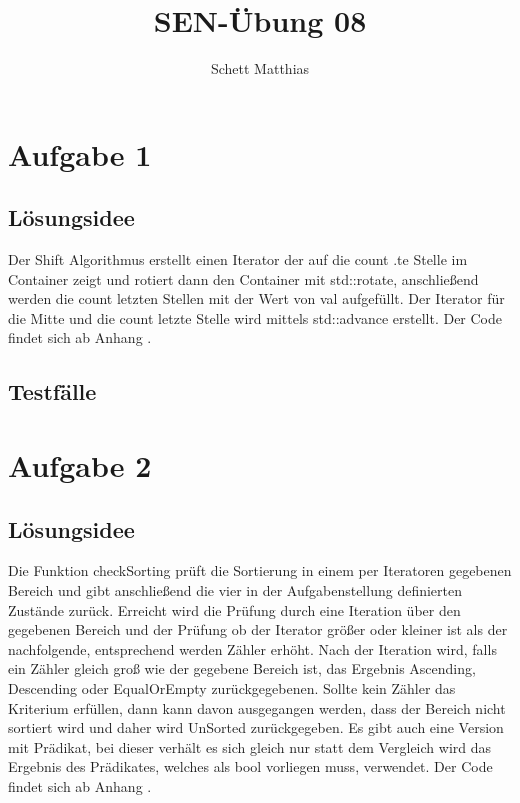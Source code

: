\documentclass[a4paper,oneside,openany]{tufte-book}
\author{Schett Matthias}
\title{SEN-\"{U}bung 08}
\begin{document}


\frontmatter

\maketitle
\tableofcontents
\mainmatter

\chapter{Aufgabe 1}

\section{L\"{o}sungsidee}

Der Shift Algorithmus erstellt einen Iterator der auf die count .te Stelle im Container zeigt und rotiert dann den Container mit std::rotate, anschließend werden die count letzten Stellen mit der Wert von val
aufgefüllt.
Der Iterator für die Mitte und die count letzte Stelle wird mittels std::advance erstellt.
Der Code findet sich ab Anhang .

\section{Testf\"{a}lle}
\begin{fullwidth}

\end{fullwidth}
\chapter{Aufgabe 2}

\section{L\"{o}sungsidee}

Die Funktion checkSorting prüft die Sortierung in einem per Iteratoren gegebenen Bereich und gibt anschließend die vier in der Aufgabenstellung definierten Zustände zurück.
Erreicht wird die Prüfung durch eine Iteration über den gegebenen Bereich und der Prüfung ob der Iterator größer oder kleiner ist als der nachfolgende, entsprechend werden Zähler erhöht.
Nach der Iteration wird, falls ein Zähler gleich groß wie der gegebene Bereich ist, das Ergebnis Ascending, Descending oder EqualOrEmpty zurückgegebenen. Sollte kein Zähler das Kriterium erfüllen,
dann kann davon ausgegangen werden, dass der Bereich nicht sortiert wird und daher wird UnSorted zurückgegeben.
Es gibt auch eine Version mit Prädikat, bei dieser verhält es sich gleich nur statt dem Vergleich wird das Ergebnis des Prädikates, welches als bool vorliegen muss, verwendet.
Der Code findet sich ab Anhang .
\end{document}
